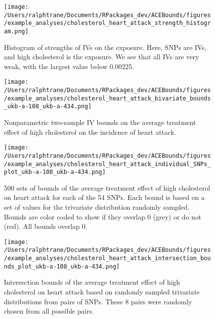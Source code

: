 \documentclass[
]{article}
\theoremstyle{plain}
\begin{document}
\begin{figure}[H]
 \center
 \texttt{[image: /Users/ralphtrane/Documents/RPackages\_dev/ACEBounds/figures/example\_analyses/cholesterol\_heart\_attack\_strength\_histogram.png]}
 \caption{Histogram of strengths of IVs on the exposure. Here, SNPs are IVs, and high cholesterol is the exposure. We see that all IVs are very weak, with the largest value below 0.00225.}
 \label{fig:cholesterol_heart_attack_strength_histogram}
\end{figure}

\begin{figure}[H]
  \texttt{[image: /Users/ralphtrane/Documents/RPackages\_dev/ACEBounds/figures/example\_analyses/cholesterol\_heart\_attack\_bivariate\_bounds\_ukb-a-108\_ukb-a-434.png]}
  \caption{Nonparametric two-sample IV bounds on the average treatment effect of high cholesterol on the incidence of heart attack.}
  \label{fig:cholesterol_on_heart_attack_ind_bounds}
\end{figure}

\clearpage

\begin{sidewaysfigure}
  \center
  \texttt{[image: /Users/ralphtrane/Documents/RPackages\_dev/ACEBounds/figures/example\_analyses/cholesterol\_heart\_attack\_individual\_SNPs\_plot\_ukb-a-108\_ukb-a-434.png]}
    \caption{500 sets of bounds of the average treatment effect of high cholesterol on heart attack for each of the 54 SNPs. Each bound is based on a set of values for the trivariate distribution randomly sampled. Bounds are color coded to show if they overlap 0 (grey) or do not (red). All bounds overlap 0.}
    \label{fig:cholesterol_heart_attack_tri_bounds_all}
\end{sidewaysfigure}

\clearpage

\begin{figure}[H]
  \center
  \texttt{[image: /Users/ralphtrane/Documents/RPackages\_dev/ACEBounds/figures/example\_analyses/cholesterol\_heart\_attack\_intersection\_bounds\_plot\_ukb-a-108\_ukb-a-434.png]}
  \caption{Intersection bounds of the average treatment effect of high cholesterol on heart attack based on randomly sampled trivariate distributions from pairs of SNPs. These 8 pairs were randomly chosen from all possible pairs.}
  \label{fig:cholesterol_on_heart_attack_intersections}
\end{figure}

\newpage

\printbibliography
\end{document}
